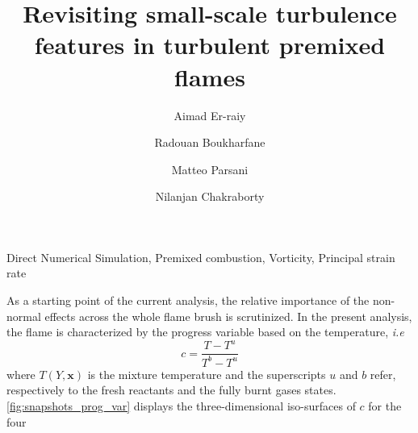 \documentclass[review,times,sort&compress]{elsarticle}
\newcommand{\ie}{\emph{i.e~}}
\begin{document}
\begin{frontmatter}
\title{\textbf{Revisiting small-scale turbulence features in turbulent premixed flames }}
\author[KAUST]{Aimad Er-raiy}
\author[KAUST]{Radouan Boukharfane}
\author[KAUST]{Matteo Parsani}
\author[NEWCASTLE]{Nilanjan Chakraborty}
\address[KAUST]{King Abdullah University of Science and Technology (KAUST), Computer Electrical 
and Mathematical Science and Engineering Division (CEMSE), Extreme Computing Research 
Center (ECRC), 23955-6900, Thuwal, Saudi Arabia}
\address[NEWCASTLE]{School of Engineering, Newcastle university, Claremont Road, Newcastle-Upon-Tyne
NE1 7RU, UK}
\begin{abstract}
\end{abstract}
\begin{keyword}
Direct Numerical Simulation, Premixed combustion, Vorticity, Principal strain rate
\end{keyword}
\end{frontmatter}



As a starting point of the current analysis, the relative importance of the non-normal effects across
the whole flame brush is scrutinized.
%
In the present analysis, the flame is characterized by the progress variable based on the temperature, \ie
%
\begin{equation}
    c = \frac{T - T^u}{T^b-T^u}
\end{equation}
%
where $T(Y, \mathbf{x})$ is the mixture temperature and the superscripts $u$ and $b$ refer, 
respectively to the fresh reactants and the fully burnt gases states.
%
\autoref{fig:snapshots_prog_var} displays the three-dimensional iso-surfaces of $c$ for the four 
\end{document}
